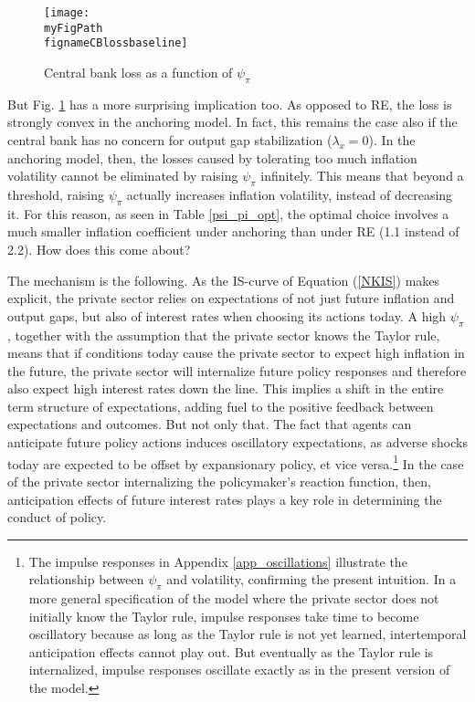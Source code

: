 \documentclass[11pt]{article}
\def \myFigPath {../../figures/}
\renewcommand{\[}{\begin{equation}}
\renewcommand{\]}{\end{equation}}
\def\fignameCBlossbaseline{plot_sim_loss_approx_pretty_losses_again_critsmooth_constant_only_pi_only_lamx0_05_lami0_2020_09_19}
\begin{document}
\begin{figure}[h!]
\texttt{[image: \\myFigPath \\fignameCBlossbaseline]}
\caption{Central bank loss as a function of $\psi_{\pi}$}
\label{fig_loss}
\end{figure}



But Fig. \ref{fig_loss} has a more surprising implication too. As opposed to RE, the loss is strongly convex in the anchoring model. In fact, this remains the case also if the central bank has no concern for output gap stabilization ($\lambda_x = 0$). In the anchoring model, then, the losses caused by tolerating too much inflation volatility cannot be eliminated by raising $\psi_{\pi}$ infinitely. This means that beyond a threshold, raising $\psi_{\pi}$ actually increases inflation volatility, instead of decreasing it. For this reason, as seen in Table \ref{psi_pi_opt}, the optimal choice involves a much smaller inflation coefficient under anchoring than under RE (1.1 instead of 2.2). How does this come about?

The mechanism is the following. As the IS-curve of Equation (\ref{NKIS}) makes explicit, the private sector relies on expectations of not just future inflation and output gaps, but also of interest rates when choosing its actions today. A high $\psi_{\pi}$, together with the assumption that the private sector knows the Taylor rule, means that if conditions today cause the private sector to expect high inflation in the future, the private sector will internalize future policy responses and therefore also expect high interest rates down the line. This implies a shift in the entire term structure of expectations, adding fuel to the positive feedback between expectations and outcomes. But not only that. The fact that agents can anticipate future policy actions induces oscillatory expectations, as adverse shocks today are expected to be offset by expansionary policy, et vice versa.\footnote{The impulse responses in Appendix \ref{app_oscillations} illustrate the relationship between $\psi_{\pi}$ and volatility, confirming the present intuition. In a more general specification of the model where the private sector does not initially know the Taylor rule, impulse responses take time to become oscillatory because as long as the Taylor rule is not yet learned, intertemporal anticipation effects cannot play out. But eventually as the Taylor rule is internalized, impulse responses oscillate exactly as in the present version of the model.} In the case of the private sector internalizing the policymaker's reaction function, then, anticipation effects of future interest rates plays a key role in determining the conduct of policy.
\end{document}
